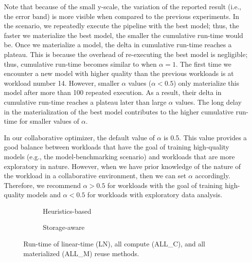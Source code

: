 Note that because of the small y-scale, the variation of the reported result (i.e., the error band) is more visible when compared to the previous experiments.
In the scenario, we repeatedly execute the pipeline with the best model; thus, the faster we materialize the best model, the smaller the cumulative run-time would be.
Once we materialize a model, the delta in cumulative run-time reaches a plateau.
This is because the overhead of re-executing the best model is negligible; thus, cumulative run-time becomes similar to when $\alpha=1$.
The first time we encounter a new model with higher quality than the previous workloads is at workload number 14.
However, smaller $\alpha$ values ($\alpha<0.5$) only materialize this model after more than 100 repeated execution.
As a result, their delta in cumulative run-time reaches a plateau later than large $\alpha$ values.
The long delay in the materialization of the best model contributes to the higher cumulative run-time for smaller values of $\alpha$.

In our collaborative optimizer, the default value of $\alpha$ is 0.5. 
This value provides a good balance between workloads that have the goal of training high-quality models (e.g., the model-benchmarking scenario) and workloads that are more exploratory in nature.
However, when we have prior knowledge of the nature of the workload in a collaborative environment, then we can set $\alpha$ accordingly.
Therefore, we recommend $\alpha>0.5$ for workloads with the goal of training high-quality models and $\alpha<0.5$ for workloads with exploratory data analysis.
\begin{figure}[h]
\begin{subfigure}[b]{0.5\linewidth}
\centering
 \resizebox{\columnwidth}{!}{%
%
}
\caption{Heuristics-based}
\end{subfigure}%
\begin{subfigure}[b]{0.5\linewidth}
\centering
 \resizebox{\columnwidth}{!}{%
%
}
\caption{Storage-aware}
\end{subfigure}
\caption{Run-time of linear-time (LN), all compute (ALL\_C), and all materialized (ALL\_M) reuse methods.}
\label{reuse-experiment}
\vspace{-8mm}
\end{figure}
